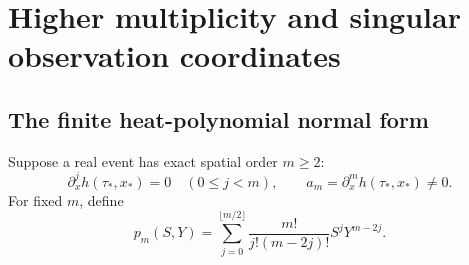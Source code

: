 \section{Higher multiplicity and singular observation coordinates}
\label{sec:multiplicity}

\subsection{The finite heat-polynomial normal form}
Suppose a real event has exact spatial order \(m\geq2\):
\[
 \partial_x^jh(\tau_*,x_*)=0\quad(0\leq j<m),\qquad
 a_m=\partial_x^mh(\tau_*,x_*)\ne0.
\]
For fixed \(m\), define
\begin{equation}\label{eq:heat-poly}
 p_m(S,Y)=
 \sum_{j=0}^{\lfloor m/2\rfloor}
 \frac{m!}{j!(m-2j)!}S^jY^{m-2j}.
\end{equation}

